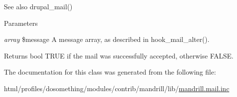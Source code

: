 \begin{DoxySeeAlso}{See also}
drupal\_\-mail()
\end{DoxySeeAlso}

\begin{DoxyParams}{Parameters}
\item[{\em array}]\$message A message array, as described in hook\_\-mail\_\-alter().\end{DoxyParams}
\begin{DoxyReturn}{Returns}
bool TRUE if the mail was successfully accepted, otherwise FALSE. 
\end{DoxyReturn}


The documentation for this class was generated from the following file:\begin{DoxyCompactItemize}
\item 
html/profiles/dosomething/modules/contrib/mandrill/lib/\hyperlink{mandrill_8mail_8inc}{mandrill.mail.inc}\end{DoxyCompactItemize}
